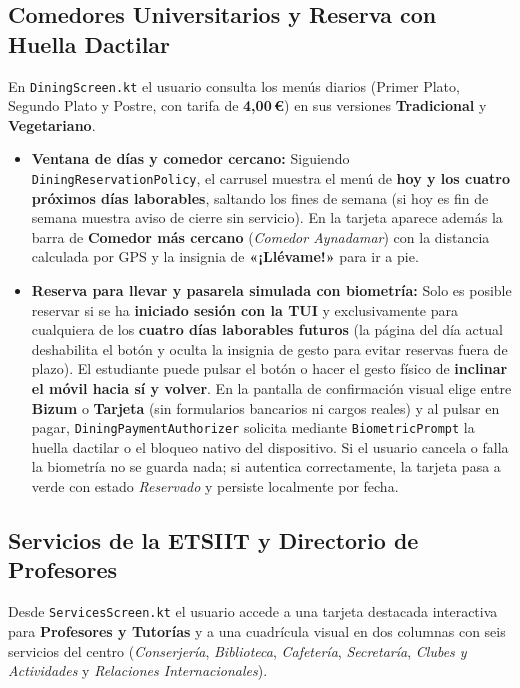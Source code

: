 \documentclass[11pt,a4paper]{article}
\begin{document}
\subsection{Comedores Universitarios y Reserva con Huella Dactilar}
En \texttt{DiningScreen.kt} el usuario consulta los menús diarios (Primer Plato, Segundo Plato y Postre, con tarifa de \textbf{4,00\,\euro}) en sus versiones \textbf{Tradicional} y \textbf{Vegetariano}.
\begin{itemize}[leftmargin=1.8em]
    \item \textbf{Ventana de días y comedor cercano:} Siguiendo \texttt{DiningReservationPolicy}, el carrusel muestra el menú de \textbf{hoy y los cuatro próximos días laborables}, saltando los fines de semana (si hoy es fin de semana muestra aviso de cierre sin servicio). En la tarjeta aparece además la barra de \textbf{Comedor más cercano} (\textit{Comedor Aynadamar}) con la distancia calculada por GPS y la insignia de \textbf{«¡Llévame!»} para ir a pie.
    \item \textbf{Reserva para llevar y pasarela simulada con biometría:} Solo es posible reservar si se ha \textbf{iniciado sesión con la TUI} y exclusivamente para cualquiera de los \textbf{cuatro días laborables futuros} (la página del día actual deshabilita el botón y oculta la insignia de gesto para evitar reservas fuera de plazo). El estudiante puede pulsar el botón o hacer el gesto físico de \textbf{inclinar el móvil hacia sí y volver}. En la pantalla de confirmación visual elige entre \textbf{Bizum} o \textbf{Tarjeta} (sin formularios bancarios ni cargos reales) y al pulsar en pagar, \texttt{DiningPaymentAuthorizer} solicita mediante \texttt{BiometricPrompt} la huella dactilar o el bloqueo nativo del dispositivo. Si el usuario cancela o falla la biometría no se guarda nada; si autentica correctamente, la tarjeta pasa a verde con estado \textit{Reservado} y persiste localmente por fecha.
\end{itemize}

\subsection{Servicios de la ETSIIT y Directorio de Profesores}
Desde \texttt{ServicesScreen.kt} el usuario accede a una tarjeta destacada interactiva para \textbf{Profesores y Tutorías} y a una cuadrícula visual en dos columnas con seis servicios del centro (\textit{Conserjería}, \textit{Biblioteca}, \textit{Cafetería}, \textit{Secretaría}, \textit{Clubes y Actividades} y \textit{Relaciones Internacionales}).
\end{document}
